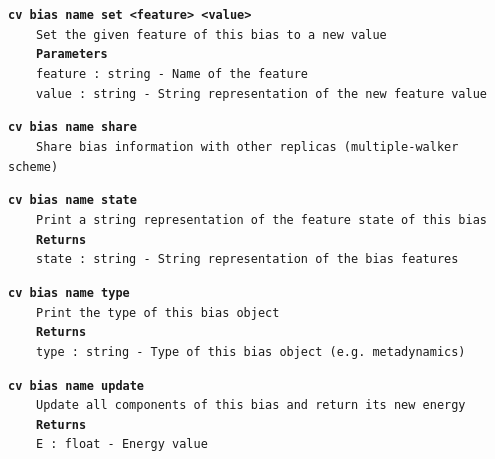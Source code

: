 \begin{mdexampleinput}{}
\texttt{\textbf{cv bias name set <feature> <value>}}
\\
\-~~~~\texttt{Set the given feature of this bias to a new value}
\\
\-~~~~\texttt{\textbf{Parameters}}
\\
\-~~~~\texttt{feature : string - Name of the feature}
\\
\-~~~~\texttt{value : string - String representation of the new feature value}
\end{mdexampleinput}
\begin{mdexampleinput}{}
\texttt{\textbf{cv bias name share}}
\\
\-~~~~\texttt{Share bias information with other replicas (multiple-walker scheme)}
\end{mdexampleinput}
\begin{mdexampleinput}{}
\texttt{\textbf{cv bias name state}}
\\
\-~~~~\texttt{Print a string representation of the feature state of this bias}
\\
\-~~~~\texttt{\textbf{Returns}}
\\
\-~~~~\texttt{state : string - String representation of the bias features}
\end{mdexampleinput}
\begin{mdexampleinput}{}
\texttt{\textbf{cv bias name type}}
\\
\-~~~~\texttt{Print the type of this bias object}
\\
\-~~~~\texttt{\textbf{Returns}}
\\
\-~~~~\texttt{type : string - Type of this bias object (e.g. metadynamics)}
\end{mdexampleinput}
\begin{mdexampleinput}{}
\texttt{\textbf{cv bias name update}}
\\
\-~~~~\texttt{Update all components of this bias and return its new energy}
\\
\-~~~~\texttt{\textbf{Returns}}
\\
\-~~~~\texttt{E : float - Energy value}
\end{mdexampleinput}
